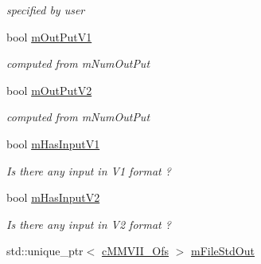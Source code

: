\begin{DoxyCompactItemize}
\begin{DoxyCompactList}\small\item\em specified by user \end{DoxyCompactList}\item 
bool \hyperlink{classMMVII_1_1cMMVII__Appli_aab0afe4402fb58c398d89b89b09e654e}{m\+Out\+Put\+V1}\hypertarget{classMMVII_1_1cMMVII__Appli_aab0afe4402fb58c398d89b89b09e654e}{}\label{classMMVII_1_1cMMVII__Appli_aab0afe4402fb58c398d89b89b09e654e}

\begin{DoxyCompactList}\small\item\em computed from m\+Num\+Out\+Put \end{DoxyCompactList}\item 
bool \hyperlink{classMMVII_1_1cMMVII__Appli_a9ec8d0edd89cc621fc3264b4d6136ad0}{m\+Out\+Put\+V2}\hypertarget{classMMVII_1_1cMMVII__Appli_a9ec8d0edd89cc621fc3264b4d6136ad0}{}\label{classMMVII_1_1cMMVII__Appli_a9ec8d0edd89cc621fc3264b4d6136ad0}

\begin{DoxyCompactList}\small\item\em computed from m\+Num\+Out\+Put \end{DoxyCompactList}\item 
bool \hyperlink{classMMVII_1_1cMMVII__Appli_ab40953e2aa13c8918813cda3baddc1ac}{m\+Has\+Input\+V1}\hypertarget{classMMVII_1_1cMMVII__Appli_ab40953e2aa13c8918813cda3baddc1ac}{}\label{classMMVII_1_1cMMVII__Appli_ab40953e2aa13c8918813cda3baddc1ac}

\begin{DoxyCompactList}\small\item\em Is there any input in V1 format ? \end{DoxyCompactList}\item 
bool \hyperlink{classMMVII_1_1cMMVII__Appli_ae4cda21bcebf0c3c5d9ea6743458daf9}{m\+Has\+Input\+V2}\hypertarget{classMMVII_1_1cMMVII__Appli_ae4cda21bcebf0c3c5d9ea6743458daf9}{}\label{classMMVII_1_1cMMVII__Appli_ae4cda21bcebf0c3c5d9ea6743458daf9}

\begin{DoxyCompactList}\small\item\em Is there any input in V2 format ? \end{DoxyCompactList}\item 
std\+::unique\+\_\+ptr$<$ \hyperlink{classMMVII_1_1cMMVII__Ofs}{c\+M\+M\+V\+I\+I\+\_\+\+Ofs} $>$ \hyperlink{classMMVII_1_1cMMVII__Appli_a1451d999479ebc46ee77273b753d7803}{m\+File\+Std\+Out}\hypertarget{classMMVII_1_1cMMVII__Appli_a1451d999479ebc46ee77273b753d7803}{}\label{classMMVII_1_1cMMVII__Appli_a1451d999479ebc46ee77273b753d7803}


\end{DoxyCompactItemize}
